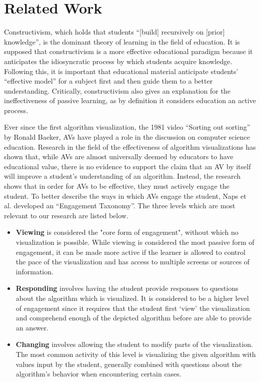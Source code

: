 \documentclass{acm_proc_article-sp}
\begin{document}
\section{Related Work}
Constructivism, which holds that students ``[build] recursively on [prior] knowledge'', is the dominant theory of learning in the field of education.
It is supposed that constructivism is a more effective educational paradigm because it anticipates the idiosyncratic process by which students acquire knowledge\cite{constr}.
Following this, it is important that educational material anticipate students' ``effective model'' for a subject first and then guide them to a better understanding.
Critically, constructivism also gives an explanation for the ineffectiveness of passive learning, as by definition it considers education an active process\cite{constr}.

Ever since the first algorithm visualization, the 1981 video ``Sorting out sorting'' by Ronald Baeker\cite{sorting}, AVs have played a role in the discussion on computer science education.
Research in the field of the effectiveness of algorithm visualizations has shown that, while AVs are almost universally deemed by educators to have educational value\cite{tnaps:visengage}, there is no evidence to support the claim that an AV by itself will improve a student's understanding of an algorithm.
Instead, the research shows that in order for AVs to be effective, they must actively engage the student\cite{tnaps:visengage}.
To better describe the ways in which AVs engage the student, Naps et al.
developed an ``Engagement Taxonomy''.
The three levels which are most relevant to our research are listed below.\cite{tnaps:visengage}

\begin{itemize}

\item \textbf{Viewing} is considered the "core form of engagement", without which no visualization is possible.
While viewing is considered the most passive form of engagement, it can be made more active if the learner is allowed to control the pace of the visualization and has access to multiple screens or sources of information.

\item \textbf{Responding} involves having the student provide responses to questions about the algorithm which is visualized.
It is considered to be a higher level of engagement since it requires that the student first `view' the visualization and comprehend enough of the depicted algorithm before are able to provide an answer.

\item \textbf{Changing} involves allowing the student to modify parts of the visualization.
The most common activity of this level is visualizing the given algorithm with values input by the student, generally combined with questions about the algorithm's behavior when encountering certain cases.

\end{itemize}
\end{document}
